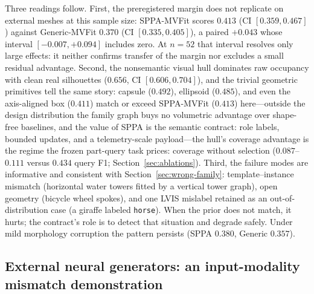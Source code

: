 \documentclass[11pt,a4paper]{article}
\begin{document}
Three readings follow. First, the preregistered margin does not replicate on
external meshes at this sample size: SPPA-MVFit scores \(0.413\) (CI
\([0.359,0.467]\)) against Generic-MVFit \(0.370\) (CI \([0.335,0.405]\)), a
paired \(+0.043\) whose interval \([-0.007,+0.094]\) includes zero. At
\(n{=}52\) that interval resolves only large effects: it neither confirms
transfer of the margin nor excludes a small residual advantage. Second,
the nonsemantic visual hull dominates raw occupancy with clean real
silhouettes (\(0.656\), CI \([0.606,0.704]\)), and the trivial geometric
primitives tell the same story: capsule (\(0.492\)), ellipsoid (\(0.485\)),
and even the axis-aligned box (\(0.411\)) match or exceed SPPA-MVFit
(\(0.413\)) here---outside the design distribution the family graph buys no
volumetric advantage over shape-free baselines, and the value of SPPA is the
semantic contract: role labels, bounded updates, and a telemetry-scale
payload---the hull's coverage advantage is the regime the frozen part-query
task prices: coverage without selection (\(0.087\)--\(0.111\) versus
\(0.434\) query F1; Section~\ref{sec:ablations}). Third, the failure modes are informative and consistent with
Section~\ref{sec:wrong-family}: template--instance mismatch (horizontal water
towers fitted by a vertical tower graph), open geometry (bicycle wheel
spokes), and one LVIS mislabel retained as an out-of-distribution case (a
giraffe labeled \texttt{horse}). When the prior does not match, it hurts; the
contract's role is to detect that situation and degrade safely. Under mild
morphology corruption the pattern persists (SPPA \(0.380\), Generic
\(0.357\)).

\subsection{External neural generators: an input-modality mismatch demonstration}
\label{sec:neural-external-wave}
\end{document}
